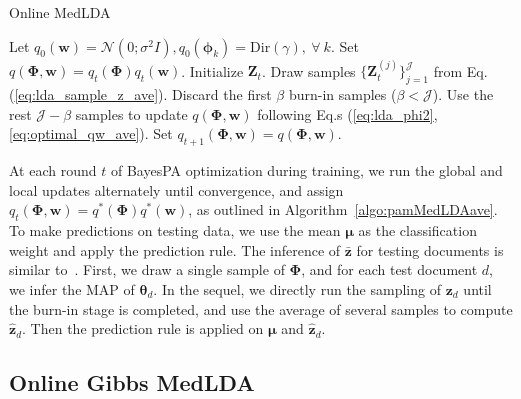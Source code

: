 \documentclass[twoside,11pt]{article}
\newcommand{\zv}{\bm{z}}
\newcommand{\Zv}{\bm{Z}}
\newcommand{\wv}{\bm{w}}
\newcommand{\thetav}{\bm{\theta}}
\newcommand{\phiv}{\bm{\phi}}
\newcommand{\Phiv}{\bm{\Phi}}
\newcommand{\muv}{\bm \mu}
\newcommand{\barzv}{\bm{\bar{z}}}
\begin{document}
\begin{algorithm}[t]
\caption{\small{Online MedLDA}}
\label{algo:pamMedLDAave}
\begin{algorithmic}[1]
\STATE Let $q_0(\wv) = \mathcal{N}(0; \sigma^2 I), q_0(\phiv_k) = \text{Dir}(\gamma), ~\forall~ k$.
\STATE Set $q(\Phiv, \wv) = q_t(\Phiv) q_t(\wv)$. Initialize $\bm{Z}_t$.
\STATE Draw samples $\{\Zv_t^{(j)}\}_{j=1}^{\mathcal{J}}$ from  Eq. (\ref{eq:lda_sample_z_ave}).
\STATE Discard the first $\beta$ burn-in samples ($\beta < \mathcal{J}$).
\STATE Use the rest $\mathcal{J}-\beta$ samples to update $q(\Phiv, \wv)$ following Eq.s (\ref{eq:lda_phi2}, \ref{eq:optimal_qw_ave}).
\ENDFOR
\STATE Set $q_{t+1}(\Phiv, \wv) = q(\Phiv, \wv)$.
\ENDFOR
\end{algorithmic}
\end{algorithm}

At each round $t$ of BayesPA optimization during training, we run the global and local updates alternately until convergence, and assign $q_t(\Phiv, \wv) = q^*(\Phiv)q^*(\wv)$, as outlined in Algorithm~\ref{algo:pamMedLDAave}. To make predictions on testing data, we use the mean $\muv$ as the classification weight and apply the prediction rule. The inference of $\barzv$ for testing documents is similar to~\citet{zhugibbs2013}. First, we draw a single sample of $\Phiv$, and for each test document $d$, we infer the MAP of $\thetav_d$. In the sequel, we directly run the sampling of $\zv_d$ until the burn-in stage is completed, and use the average of several samples to compute $\widehat{\zv}_d$. Then the prediction rule is applied on $\muv$ and $\widehat{\zv}_d$.




\subsection{Online Gibbs MedLDA}\label{sec:gibbsmedlda}
\end{document}
